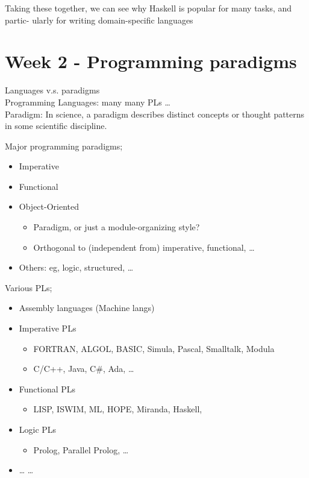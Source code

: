 \documentclass[tikz,border=10pt]{project_plan}
\begin{document}
Taking these together, we can see why Haskell is popular for many tasks, and partic-
ularly for writing domain-specific languages

\chapter{Week 2 - Programming paradigms}

Languages v.s. paradigms\\
Programming Languages: many many PLs …\\
Paradigm: In science, a paradigm describes distinct concepts or thought patterns in some scientific discipline.

Major programming paradigms;
\begin{itemize}
  \item Imperative
  \item Functional
  \item Object-Oriented \begin{itemize}
          \item Paradigm, or just a module-organizing style?
          \item Orthogonal to (independent from) imperative, functional, …
        \end{itemize}
  \item Others: eg, logic, structured, …
\end{itemize}

Various PLs;
\begin{itemize}
  \item Assembly languages (Machine langs)
  \item Imperative PLs
        \begin{itemize}
          \item FORTRAN, ALGOL, BASIC, Simula, Pascal, Smalltalk, Modula
          \item C/C++, Java, C\#, Ada, …
        \end{itemize}
  \item Functional PLs
        \begin{itemize}
          \item LISP, ISWIM, ML, HOPE, Miranda, Haskell,
        \end{itemize}
  \item Logic PLs
        \begin{itemize}
          \item Prolog, Parallel Prolog, …
        \end{itemize}
  \item … …
\end{itemize}
\end{document}
